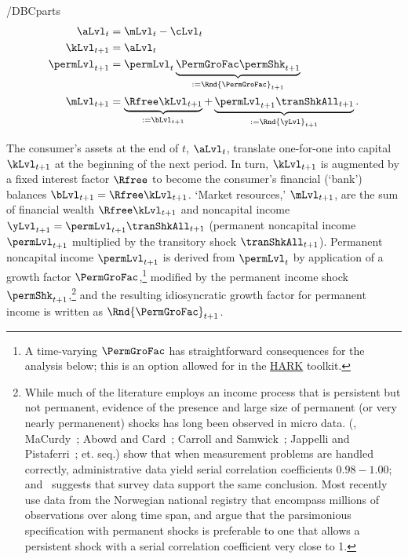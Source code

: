 \documentclass[BufferStockTheory]{subfiles}
\begin{document}
\begin{verbatimwrite}{\EqDir/DBCparts}
  \begin{equation}\label{eq:DBCparts} %
    \begin{aligned}
      \aLvl_{t}     & = \mLvl_{t}-\cLvl_{t}  \\
      \kLvl_{t+1}   & = \aLvl_{t} \notag \\
      \permLvl_{t+1}  & = \permLvl_{t} \underbrace{\PermGroFac\permShk_{t+1}}_{:= \Rnd{\PermGroFac}_{t+1}} \notag \\
      \mLvl_{t+1}  & =   \underbrace{\Rfree \kLvl_{t+1}}_{:= \bLvl_{t+1}}  +\underbrace{\permLvl_{t+1}\tranShkAll_{t+1}}_{:= \Rnd{\yLvl}_{t+1}}. \notag
    \end{aligned}
  \end{equation}
\end{verbatimwrite}\unskip


The consumer's assets at the end of $t$, $\aLvl_{t}$, translate one-for-one into capital $\kLvl_{t+1}$ at the beginning of the next period.
In turn, $\kLvl_{t+1}$ is augmented by a fixed interest factor $\Rfree$ to become the consumer's financial (`bank') balances $\bLvl_{t+1} = \Rfree \kLvl_{t+1}$.  `Market resources,' $\mLvl_{t+1}$,  are the sum of financial wealth $\Rfree \kLvl_{t+1}$ and noncapital income $\yLvl_{t+1}=\permLvl_{t+1}\tranShkAll_{t+1}$ (permanent noncapital income $\permLvl_{t+1}$ multiplied by the transitory shock $\tranShkAll_{t+1}$).
Permanent noncapital income $\permLvl_{t+1}$ is derived from $\permLvl_{t}$ by application of a growth factor $\PermGroFac$,\footnote{A time-varying $\PermGroFac$ has straightforward consequences for the analysis below; this is an option allowed for in the \href{https://econ-ark.org}{HARK} toolkit.} modified by the permanent income shock $\permShk_{t+1}$,\footnote{While much of the literature employs an income process that is persistent but not permanent, evidence of the presence and large size of permanent (or very nearly permanenent) shocks has long been observed in micro data.
  (\cite{lwComponents}, MaCurdy~\citeyearpar{macurdyTimeseries}; Abowd and Card~\citeyearpar{acCovariance}; Carroll and Samwick~\citeyearpar{csNature}; Jappelli and Pistaferri~\citeyear{jpCins}; et. seq.)
  \cite{dhmImproving} show that when measurement problems are handled correctly, administrative data yield serial correlation coefficients $0.98-1.00$; and~\cite{dmHowMuch} suggests that survey data support the same conclusion.  Most recently \cite{crawleyParsimonious} use data from the Norwegian national registry that encompass millions of observations over along time span, and argue that the parsimonious specification with permanent shocks is preferable to one that allows a persistent shock with a serial correlation coefficient very close to 1.
  } and the resulting idiosyncratic growth factor for permanent income is written as $\Rnd{\PermGroFac}_{t+1}$.
\end{document}
